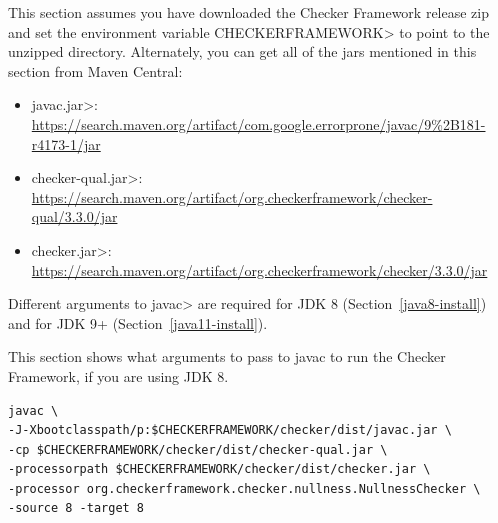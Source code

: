 This
section assumes you have downloaded the Checker Framework release zip and set
the environment variable \<CHECKERFRAMEWORK> to point to the unzipped directory.
Alternately, you can get all of the jars mentioned in this section from Maven Central:

\begin{itemize}
\item \<javac.jar>: \url{https://search.maven.org/artifact/com.google.errorprone/javac/9%2B181-r4173-1/jar}
\item \<checker-qual.jar>: \url{https://search.maven.org/artifact/org.checkerframework/checker-qual/3.3.0/jar}
\item \<checker.jar>: \url{https://search.maven.org/artifact/org.checkerframework/checker/3.3.0/jar}
\end{itemize}

Different arguments to \<javac> are required for JDK 8
(Section~\ref{java8-install}) and for JDK 9+ (Section~\ref{java11-install}).



This section shows what arguments to pass to javac to run the Checker
Framework, if you are using JDK 8.

\begin{Verbatim}
javac \
-J-Xbootclasspath/p:$CHECKERFRAMEWORK/checker/dist/javac.jar \
-cp $CHECKERFRAMEWORK/checker/dist/checker-qual.jar \
-processorpath $CHECKERFRAMEWORK/checker/dist/checker.jar \
-processor org.checkerframework.checker.nullness.NullnessChecker \
-source 8 -target 8
\end{Verbatim}

